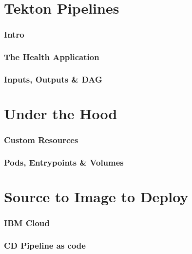 \documentclass[aspectratio=169,11pt,hyperref={colorlinks=true}]{beamer}
\begin{document}
\begin{lblackrwhiteframe}
\section{Tekton Pipelines}

\begin{grayframe}
  \frametitle{Intro}
\end{grayframe}

\begin{grayframe}
  \frametitle{The Health Application}
\end{grayframe}

\begin{grayframe}
  \frametitle{Inputs, Outputs \& DAG}
\end{grayframe}

\section{Under the Hood}

\begin{grayframe}
  \frametitle{Custom Resources}
\end{grayframe}

\begin{grayframe}
  \frametitle{Pods, Entrypoints \& Volumes}
\end{grayframe}

\section{Source to Image to Deploy}

\begin{grayframe}
  \frametitle{IBM Cloud}
\end{grayframe}

\begin{grayframe}
  \frametitle{CD Pipeline as code}
\end{grayframe}


\end{lblackrwhiteframe}
\end{document}

